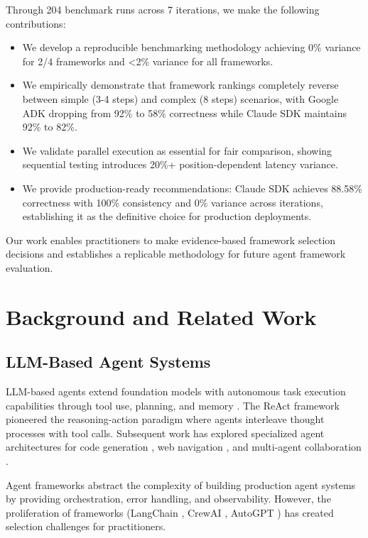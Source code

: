 \documentclass[sigconf,nonacm]{acmart}
\begin{document}
Through 204 benchmark runs across 7 iterations, we make the following contributions:

\begin{itemize}
\item We develop a reproducible benchmarking methodology achieving 0\% variance for 2/4 frameworks and <2\% variance for all frameworks.
\item We empirically demonstrate that framework rankings completely reverse between simple (3-4 steps) and complex (8 steps) scenarios, with Google ADK dropping from 92\% to 58\% correctness while Claude SDK maintains 92\% to 82\%.
\item We validate parallel execution as essential for fair comparison, showing sequential testing introduces 20\%+ position-dependent latency variance.
\item We provide production-ready recommendations: Claude SDK achieves 88.58\% correctness with 100\% consistency and 0\% variance across iterations, establishing it as the definitive choice for production deployments.
\end{itemize}

Our work enables practitioners to make evidence-based framework selection decisions and establishes a replicable methodology for future agent framework evaluation.

\section{Background and Related Work}

\subsection{LLM-Based Agent Systems}

LLM-based agents extend foundation models with autonomous task execution capabilities through tool use, planning, and memory \cite{wang2024survey}. The ReAct framework \cite{yao2023react} pioneered the reasoning-action paradigm where agents interleave thought processes with tool calls. Subsequent work has explored specialized agent architectures for code generation \cite{qin2023toolllm}, web navigation \cite{zhou2023webarena}, and multi-agent collaboration \cite{hong2023metagpt}.

Agent frameworks abstract the complexity of building production agent systems by providing orchestration, error handling, and observability. However, the proliferation of frameworks (LangChain \cite{langchain2023}, CrewAI \cite{crewai2024}, AutoGPT \cite{autogpt2023}) has created selection challenges for practitioners.
\end{document}
